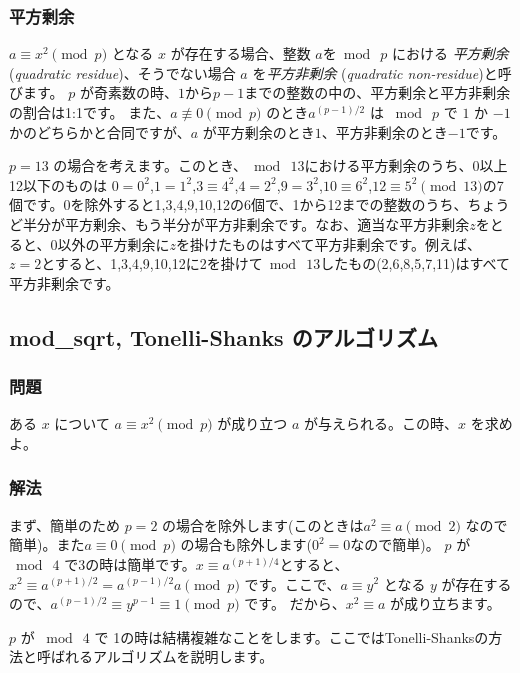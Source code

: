 \documentclass{jsarticle}
\begin{document}
   \subsubsection{平方剰余}
   \label{subsubsec:quadratic-residue}
   $a \equiv x^2 \pmod p$ となる $x$ が存在する場合、整数 $a$を$\bmod\ p$ における \emph{平方剰余} (\emph{quadratic residue})、そうでない場合 $a$ を\emph{平方非剰余} (\emph{quadratic non-residue})と呼びます。
   $p$ が奇素数の時、$1$から$p-1$までの整数の中の、平方剰余と平方非剰余の割合は1:1です。
   また、$a\not\equiv 0 \pmod p$ のとき$a^{(p-1)/2}$ は $\bmod\ p$ で $1$ か $-1$ かのどちらかと合同ですが、$a$ が平方剰余のとき$1$、平方非剰余のとき$-1$です。
   \begin{example}
    $p = 13$ の場合を考えます。このとき、$\bmod\ 13$における平方剰余のうち、0以上12以下のものは $0=0^2$,$1=1^2$,$3\equiv 4^2$,$4=2^2$,$9=3^2$,$10\equiv 6^2$,$12 \equiv 5^2 \pmod{13}$の7個です。0を除外すると1,3,4,9,10,12の6個で、1から12までの整数のうち、ちょうど半分が平方剰余、もう半分が平方非剰余です。なお、適当な平方非剰余$z$をとると、0以外の平方剰余に$z$を掛けたものはすべて平方非剰余です。例えば、$z=2$とすると、1,3,4,9,10,12に2を掛けて$\bmod\ 13$したもの(2,6,8,5,7,11)はすべて平方非剰余です。
   \end{example}
  \subsection{mod\_sqrt, Tonelli-Shanks のアルゴリズム}
  \label{subsec:tonelli-shanks}
\subsubsection{問題}
ある $x$ について $a \equiv x^2 \pmod p$ が成り立つ $a$ が与えられる。この時、$x$ を求めよ。

\subsubsection{解法}
まず、簡単のため $p = 2$ の場合を除外します(このときは$a^2 \equiv a \pmod 2$ なので簡単)。また$a \equiv 0 \pmod p$ の場合も除外します($0^2 = 0$なので簡単)。
$p$ が$\bmod\ 4$ で3の時は簡単です。$x \equiv a^{(p+1)/4}$とすると、$x^2 \equiv a^{(p+1)/2} = a^{(p-1)/2}a \pmod p$ です。ここで、$a \equiv y^2$ となる $y$ が存在するので、$a^{(p-1)/2}\equiv y^{p-1}\equiv 1 \pmod p$ です。
だから、$x^2 \equiv a$ が成り立ちます。

$p$ が $\bmod\ 4$ で 1の時は結構複雑なことをします。ここではTonelli-Shanksの方法と呼ばれるアルゴリズムを説明します。
\end{document}
